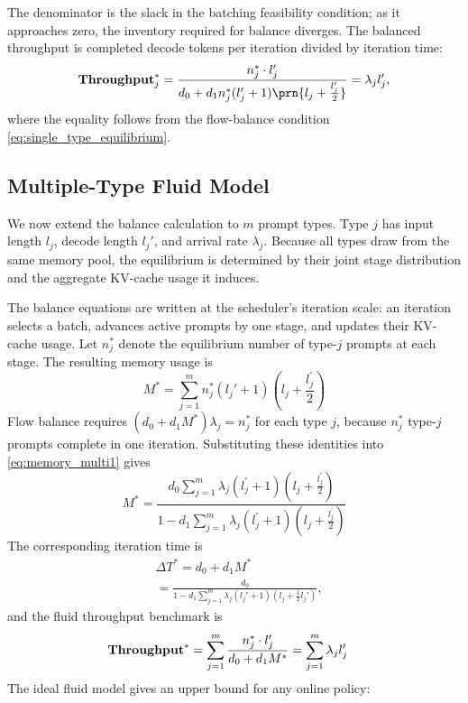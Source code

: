 The denominator is the slack in the batching feasibility condition; as it approaches zero, the inventory required for balance diverges. The balanced throughput is completed decode tokens per iteration divided by iteration time:
\begin{equation}\label{eq:throughput_fluid}
\throughput_j^* = \frac{n_j^* \cdot l_j'}{d_0+d_1n_j^*(l_j'+1)\prn{l_j+\frac{l_j'}{2}}} = \lambda_j l_j',
\end{equation}
where the equality follows from the flow-balance condition \eqref{eq:single_type_equilibrium}.

\subsection{Multiple-Type Fluid Model}
We now extend the balance calculation to \(m\) prompt types. Type \(j\) has input length \(l_j\), decode length \(l_j'\), and arrival rate \(\lambda_j\). Because all types draw from the same memory pool, the equilibrium is determined by their joint stage distribution and the aggregate KV-cache usage it induces.

The balance equations are written at the scheduler's iteration scale: an iteration selects a batch, advances active prompts by one stage, and updates their KV-cache usage. Let \(n_j^*\) denote the equilibrium number of type-\(j\) prompts at each stage. The resulting memory usage is
\begin{equation}
\label{eq:memory_multi1}
    M^* = \sum_{j=1}^m n_j^*(l_j'+1)\left(l_j + \frac{l_j^\prime}{2}\right)
\end{equation}
Flow balance requires \((d_0+d_1M^*)\lambda_j = n_j^*\) for each type \(j\), because \(n_j^*\) type-\(j\) prompts complete in one iteration. Substituting these identities into \eqref{eq:memory_multi1} gives
\begin{equation}
\label{eq:memory_multi2}
M^* = \frac{d_0\sum_{j=1}^m \lambda_j (l_j^{\prime}+1)\left(l_j + \frac{l_j^{\prime}}{2} \right)}{1-d_1\sum_{j=1}^m \lambda_j (l_j^{\prime}+1)\left(l_j + \frac{l_j^{\prime}}{2} \right) } 
\end{equation}
The corresponding iteration time is
\begin{equation}    \label{eq:time_fluid}
    \begin{aligned}
            &\Delta T^* = d_0 + d_1 M^*  \\
                  &= \frac{d_0}{1 - d_1 \sum_{j=1}^m \lambda_j (l_j' + 1)(l_j + \tfrac{1} {2}l_j')},
    \end{aligned}
\end{equation}
and the fluid throughput benchmark is
\begin{equation}
    \label{throughput_fluid_multiple}
    \begin{aligned}
        &\textbf{Throughput}^*
        = \sum_{j=1}^m \frac{n_j^* \cdot l_j^{\prime}}{d_0 + d_1 M^*}
        = \sum_{j=1}^m \lambda_j l_j^{\prime}
    \end{aligned}
\end{equation}
The ideal fluid model gives an upper bound for any online policy:

